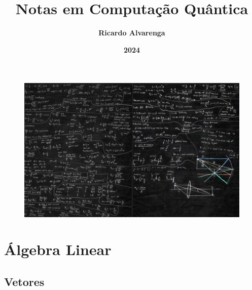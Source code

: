 \documentclass[12pt]{article}
\begin{document}
	
\title{\textbf{{\Huge Notas em Computação Quântica}}} %
\author{\textbf{{\Large Ricardo Alvarenga}}} %
\date{\textbf{{\Large 2024}}} %
\maketitle %
\thispagestyle{empty} %

\begin{figure}[H]
	\centering
	\includegraphics[width=1\linewidth]{figuras/wp5436123-quantum-physics-wallpapers}
\end{figure}


\newpage

\pagestyle{fancy}
\setcounter{page}{1} %
\tableofcontents %
\newpage

\listoffigures %
\newpage


\pagestyle{fancy}
\fancyfoot[C]{\thepage} %
\newpage

\setcounter{page}{1} %
\pagestyle{fancy}
\fancyfoot[C]{\thepage}


\onehalfspacing %

\section{Álgebra Linear}

\subsection{Vetores}
\end{document}
